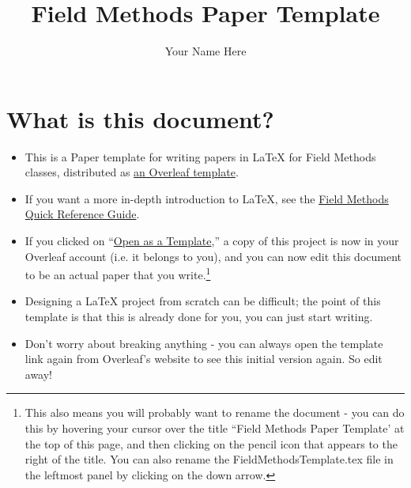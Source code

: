 \documentclass[output=paper,colorlinks,citecolor=brown]{langscibook}
\author{Your Name Here\affiliation{Pomona College}
}
\title{Field Methods Paper Template}
\begin{document}
\maketitle


\section{What is this document?}


\begin{itemize}

\item This is a Paper template for writing papers in \LaTeX{} for Field Methods classes, distributed as \href{https://www.overleaf.com/latex/templates/field-methods-paper-template/pqrxmrsptqcv}{an Overleaf template}.

\item If you want a more in-depth introduction to \LaTeX{}, see the \href{https://www.overleaf.com/latex/templates/field-methods-papers-quick-reference-guide/cqbjxwnffvrm}{Field Methods Quick Reference Guide}.

\item If you clicked on ``\href{https://www.overleaf.com/latex/templates/field-methods-paper-template/pqrxmrsptqcv}{Open as a Template},'' a copy of this project is now in your Overleaf account (i.e. it belongs to you), and you can now edit this document to be an actual paper that you write.\footnote{This also means you will probably want to rename the document - you can do this by hovering your cursor over the title ``Field Methods Paper Template' at the top of this page, and then clicking on the pencil icon that appears to the right of the title. You can also rename the FieldMethodsTemplate.tex file in the leftmost panel by clicking on the down arrow.} 

\item Designing a \LaTeX{} project from scratch can be difficult; the point of this template is that this is already done for you, you can just start writing. 

\item Don't worry about breaking anything - you can always open the template link again from Overleaf's website to see this initial version again. So edit away!


\end{itemize}
\end{document}
